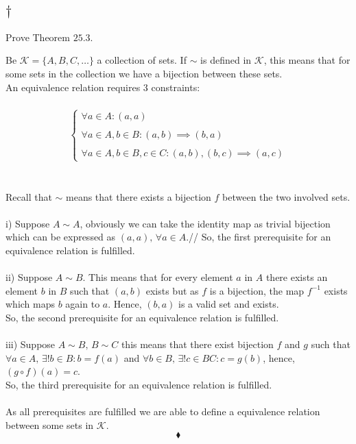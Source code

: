 \subsection{$\dagger$}
\begin{tcolorbox}
Prove Theorem $\mathbf{25.3}$. 
\end{tcolorbox}
$$ $$
 Be $\mathscr{K}=\{A,B,C,\dots\}$ a collection of sets. If $\sim$ is defined in $\mathscr{K}$, this means that for some sets in the collection we have a bijection between these sets.\\
 An equivalence relation requires $3$ constraints:\\\\
 \begin{align*}
 \left\{\begin{array}{l}
 \forall a\in A: (a,a)\\\\
 \forall a\in A,b\in B:(a,b)\implies (b,a)\\\\
 \forall a\in A,b\in B,c\in C:(a,b),(b,c)\implies (a,c)
 \end{array}\right.
 \end{align*}\\\\
 Recall that $\sim$ means that there exists a bijection $f$ between the two involved sets.\\\\
 i) Suppose $A\sim A$, obviously we can take the identity map as trivial bijection which can be expressed as $(a,a),\,\forall a\in A $.// So, the first prerequisite for an equivalence relation is fulfilled.\\\\
 ii) Suppose $A\sim B$. This means that for every element $a$ in $A$ there exists an element $b$ in  $B$  such that $(a,b)$ exists but as $f$ is a bijection, the map $f^{-1}$ exists which maps $b$ again to $a$. Hence, $(b,a)$ is a valid set and exists.\\ So, the second prerequisite for an equivalence relation is fulfilled.\\\\
 iii) Suppose $A\sim B,\, B\sim C$ this means that there exist bijection $f$ and $g$ such that $\forall a\in A,\, \exists ! b\in B: b=f(a)$ and $\forall b\in B,\, \exists ! c\in BC: c=g(b)$, hence, $(g\circ f )(a)=c$. \\ So, the third prerequisite for an equivalence relation is fulfilled.\\\\
 As all prerequisites are fulfilled we are able to define a equivalence relation between some sets in $\mathscr{K}$.
$$\blacklozenge$$

